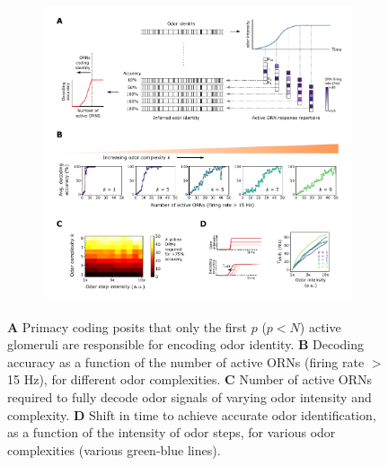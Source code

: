 \begin{figure}[!tb]
	\begin{subfigure}[t]{\linewidth}
		\includegraphics[width=\textwidth]{figures/5_primacy_coding}
		\label{fig:primacy_coding_a}	
	\end{subfigure}
	\begin{subfigure}[t]{0\linewidth}
		\label{fig:primacy_coding_b}
	\end{subfigure}
	\begin{subfigure}[t]{0\linewidth}
		\label{fig:primacy_coding_c}
	\end{subfigure}
	\begin{subfigure}[t]{0\linewidth}
		\label{fig:primacy_coding_d}
	\end{subfigure}
	\caption{\footnotesize{\textbf{A} Primacy coding posits that only the first $p$ ($p < N$) active glomeruli are responsible for encoding odor identity. \textbf{B} Decoding accuracy as a function of the number of active ORNs (firing rate $>$ 15 Hz), for different odor complexities. \textbf{C} Number of active ORNs required to fully decode odor signals of varying odor intensity and complexity. \textbf{D} Shift in time to achieve accurate odor identification, as a function of the intensity of odor steps, for various odor complexities (various green-blue lines).
}}
	\label{fig:primacy_coding}
\end{figure}




